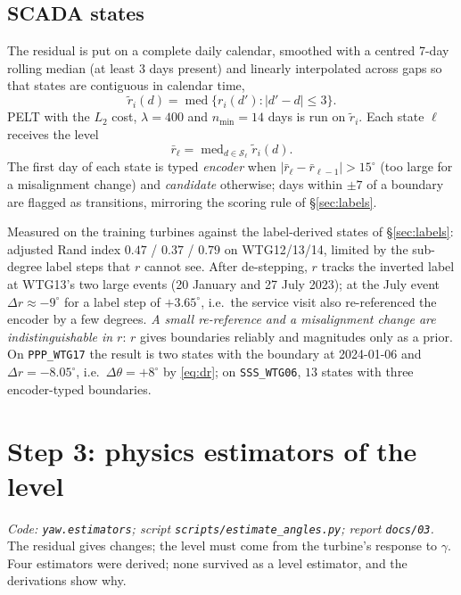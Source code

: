 \documentclass[11pt,a4paper]{article}
\theoremstyle{remark}
\newcommand{\med}{\operatorname{med}}
\newcommand{\dg}{^{\circ}}
\newcommand{\code}[1]{\texttt{#1}}
\begin{document}
\subsection{SCADA states}\label{sec:states}
The residual is put on a complete daily calendar, smoothed with a centred 7-day
rolling median (at least 3 days present) and linearly interpolated across gaps so
that states are contiguous in calendar time,
\begin{equation}
  \tilde r_i(d) = \med\{r_i(d') : |d'-d|\le3\} .
\end{equation}
PELT with the $L_2$ cost, $\lambda=400$ and $n_{\min}=14$ days is run on
$\tilde r_i$. Each state $\ell$ receives the level
\begin{equation}
  \bar r_\ell = \med_{d\in\mathcal S_\ell} \tilde r_i(d) .
  \label{eq:rlevel}
\end{equation}
The first day of each state is typed \emph{encoder} when
$|\bar r_\ell-\bar r_{\ell-1}|>15\dg$ (too large for a misalignment change) and
\emph{candidate} otherwise; days within $\pm7$ of a boundary are flagged as
transitions, mirroring the scoring rule of \S\ref{sec:labels}.

Measured on the training turbines against the label-derived states of
\S\ref{sec:labels}: adjusted Rand index $0.47$ / $0.37$ / $0.79$ on
WTG12/13/14, limited by the sub-degree label steps that $r$ cannot see. After
de-stepping, $r$ tracks the inverted label at WTG13's two large events
(20 January and 27 July 2023); at the July event $\Delta r\approx-9\dg$ for a
label step of $+3.65\dg$, i.e.\ the service visit also re-referenced the encoder
by a few degrees. \emph{A small re-reference and a misalignment change are
indistinguishable in $r$}: $r$ gives boundaries reliably and magnitudes only as
a prior. On \code{PPP\_WTG17} the result is two states with the boundary at
2024-01-06 and $\Delta r=-8.05\dg$, i.e.\ $\Delta\theta=+8\dg$ by
\eqref{eq:dr}; on \code{SSS\_WTG06}, $13$ states with three encoder-typed
boundaries.

\section{Step 3: physics estimators of the level}\label{sec:step3}
\begin{sloppypar}
\emph{Code: \code{yaw.estimators}; script \code{scripts/estimate\_angles.py};
report \code{docs/03}.} The residual gives changes; the level must come from
the turbine's response to $\gamma$. Four estimators were derived; none survived
as a level estimator, and the derivations show why.
\end{sloppypar}
\end{document}
